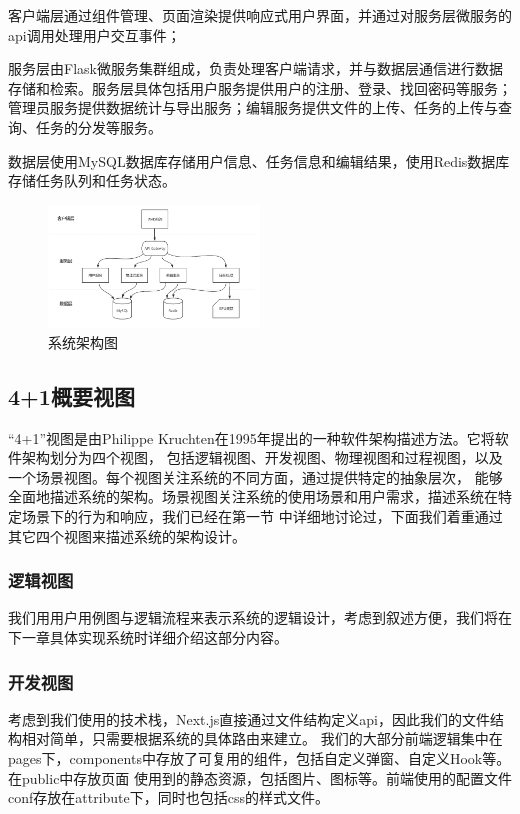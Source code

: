 客户端层通过组件管理、页面渲染提供响应式用户界面，并通过对服务层微服务的api调用处理用户交互事件；

服务层由Flask微服务集群组成，负责处理客户端请求，并与数据层通信进行数据存储和检索。服务层具体包括用户服务提供用户的注册、登录、找回密码等服务；
管理员服务提供数据统计与导出服务；编辑服务提供文件的上传、任务的上传与查询、任务的分发等服务。

数据层使用MySQL数据库存储用户信息、任务信息和编辑结果，使用Redis数据库存储任务队列和任务状态。

\begin{figure}[ht]
    \centering
    \includegraphics[width=0.5\textwidth]{source/img/system_structure.png}
    \caption{系统架构图}
    \label{fig:system-structure}
\end{figure}

\subsection{4+1概要视图}

“4+1”视图是由Philippe Kruchten在1995年提出的一种软件架构描述方法。它将软件架构划分为四个视图，
包括逻辑视图、开发视图、物理视图和过程视图，以及一个场景视图。每个视图关注系统的不同方面，通过提供特定的抽象层次，
能够全面地描述系统的架构。场景视图关注系统的使用场景和用户需求，描述系统在特定场景下的行为和响应，我们已经在第一节
中详细地讨论过，下面我们着重通过其它四个视图来描述系统的架构设计。

\subsubsection{逻辑视图}

我们用用户用例图与逻辑流程来表示系统的逻辑设计，考虑到叙述方便，我们将在下一章具体实现系统时详细介绍这部分内容。

\subsubsection{开发视图}

考虑到我们使用的技术栈，Next.js直接通过文件结构定义api，因此我们的文件结构相对简单，只需要根据系统的具体路由来建立。
我们的大部分前端逻辑集中在pages下，components中存放了可复用的组件，包括自定义弹窗、自定义Hook等。在public中存放页面
使用到的静态资源，包括图片、图标等。前端使用的配置文件conf存放在attribute下，同时也包括css的样式文件。


